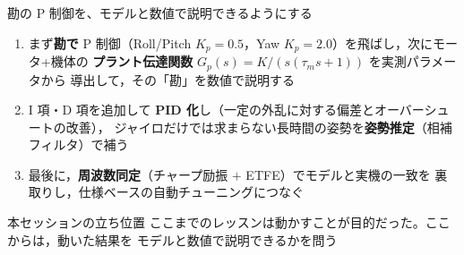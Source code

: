 \begin{frame}{勘の P 制御を、モデルと数値で説明できるようにする}
  \begin{enumerate}\footnotesize\setlength{\itemsep}{0.3em}
    \item まず\textbf{勘で} P 制御（Roll/Pitch $K_p=0.5$，Yaw $K_p=2.0$）を飛ばし，次にモータ+機体の
          \textbf{プラント伝達関数} $G_p(s)=K/(s(\tau_m s+1))$ を実測パラメータから
          導出して，その「勘」を数値で説明する
    \item I 項・D 項を追加して \textbf{PID 化}し（一定の外乱に対する偏差とオーバーシュートの改善），
          ジャイロだけでは求まらない長時間の姿勢を\textbf{姿勢推定}（相補フィルタ）で補う
    \item 最後に，\textbf{周波数同定}（チャープ励振 $+$ ETFE）でモデルと実機の一致を
          裏取りし，仕様ベースの自動チューニングにつなぐ
  \end{enumerate}

  \vspace{0.2em}

  \begin{alertblock}{本セッションの立ち位置}
    \footnotesize
    ここまでのレッスンは動かすことが目的だった。ここからは，動いた結果を
    モデルと数値で説明できるかを問う
  \end{alertblock}
\end{frame}


